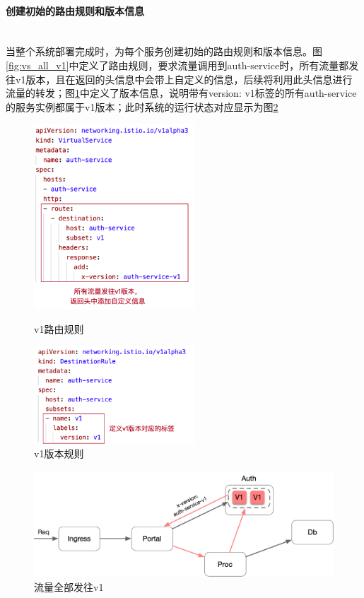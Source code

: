 \documentclass[a4paper, 12pt]{article}
\theoremstyle{definition}
\begin{document}
\paragraph{创建初始的路由规则和版本信息}\label{section:setup}\mbox{}\\

当整个系统部署完成时，为每个服务创建初始的路由规则和版本信息。图\ref{fig:vs_all_v1}中定义了路由规则，要求流量调用到auth-service时，所有流量都发往v1版本，且在返回的头信息中会带上自定义的信息，后续将利用此头信息进行流量的转发；图\ref{fig:dr_v1}中定义了版本信息，说明带有{version: v1}标签的所有auth-service的服务实例都属于v1版本；此时系统的运行状态对应显示为图\ref{fig:traffic_all_v1}
\begin{figure}[!htbp]
\centering
\begin{minipage}[t]{0.48\textwidth}
\centering
\centerline{\includegraphics[width=6cm]{vs_all_v1.png}}
\caption{v1路由规则}
\label{fig:vs_all_v1}
\end{minipage}
\begin{minipage}[t]{0.48\textwidth}
\centering
\centerline{\includegraphics[width=6cm]{dr_v1.png}}
\caption{v1版本规则}
\label{fig:dr_v1}
\end{minipage}
\end{figure}

\begin{figure}[!ht]
 \centering
 \includegraphics[height=4cm]{images/traffic_all_v1.png}
 \caption{流量全部发往v1}
 \label{fig:traffic_all_v1}
\end{figure}
\end{document}
